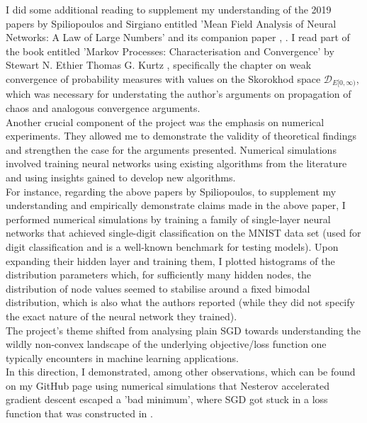 \documentclass{article}
\begin{document}
I did some additional reading to supplement my understanding of the 2019 papers by Spiliopoulos and Sirgiano entitled 'Mean Field Analysis of Neural Networks: A Law of Large Numbers' and its companion paper \cite{sirignano2019meanfieldanalysisclt}, \cite{sirignano2019meanfieldanalysislln} . I read part of the book entitled 'Markov Processes: Characterisation and Convergence' by Stewart N. Ethier Thomas G. Kurtz \cite{ethier2009markov}, specifically the chapter on weak convergence of probability measures with values on the Skorokhod space $\mathcal{D}_{E[0, \infty)}$, which was necessary for understating the author's arguments on propagation of chaos and analogous convergence arguments. \\

Another crucial component of the project was the emphasis on numerical experiments. They allowed me to demonstrate the validity of theoretical findings and strengthen the case for the arguments presented. Numerical simulations involved training neural networks using existing algorithms from the literature and using insights gained to develop new algorithms. \\

For instance, regarding the above papers by Spiliopoulos, to supplement my understanding and empirically demonstrate claims made in the above paper, I performed numerical simulations by training a family of single-layer neural networks that achieved single-digit classification on the MNIST data set (used for digit classification and is a well-known benchmark for testing models). Upon expanding their hidden layer and training them, I plotted histograms of the distribution parameters which, for sufficiently many hidden nodes, the distribution of node values seemed to stabilise around a fixed bimodal distribution, which is also what the authors reported (while they did not specify the exact nature of the neural network they trained). \\

The project's theme shifted from analysing plain SGD towards understanding the wildly non-convex landscape of the underlying objective/loss function one typically encounters in machine learning applications.\\

In this direction, I demonstrated, among other observations, which can be found on my GitHub page \cite{Tassopoulos_Imperial_Summer_Research_2023} using numerical simulations that Nesterov accelerated gradient descent escaped a 'bad minimum', where SGD got stuck in a loss function that was constructed in \cite{Mei_2018}. \\
\end{document}
